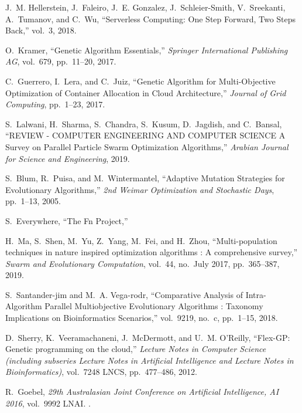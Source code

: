 \documentclass[runningheads]{llncs}
\begin{document}
   \begin{thebibliography}{10}

    J.~M. Hellerstein, J.~Faleiro, J.~E. Gonzalez, J.~Schleier-Smith, V.~Sreekanti,
      A.~Tumanov, and C.~Wu, ``{Serverless Computing: One Step Forward, Two Steps
      Back},'' vol.~3, 2018.
    
    O.~Kramer, ``{Genetic Algorithm Essentials},'' {\em Springer International
      Publishing AG}, vol.~679, pp.~11--20, 2017.
    
    C.~Guerrero, I.~Lera, and C.~Juiz, ``{Genetic Algorithm for Multi-Objective
      Optimization of Container Allocation in Cloud Architecture},'' {\em Journal
      of Grid Computing}, pp.~1--23, 2017.
    
    S.~Lalwani, H.~Sharma, S.~Chandra, S.~Kusum, D.~Jagdish, and C.~Bansal,
      ``{REVIEW - COMPUTER ENGINEERING AND COMPUTER SCIENCE A Survey on Parallel
      Particle Swarm Optimization Algorithms},'' {\em Arabian Journal for Science
      and Engineering}, 2019.
    
    S.~Blum, R.~Puisa, and M.~Wintermantel, ``{Adaptive Mutation Strategies for
      Evolutionary Algorithms},'' {\em 2nd Weimar Optimization and Stochastic
      Days}, pp.~1--13, 2005.
    
    S.~Everywhere, ``{The Fn Project},''
    
    H.~Ma, S.~Shen, M.~Yu, Z.~Yang, M.~Fei, and H.~Zhou, ``{Multi-population
      techniques in nature inspired optimization algorithms : A comprehensive
      survey},'' {\em Swarm and Evolutionary Computation}, vol.~44, no.~July 2017,
      pp.~365--387, 2019.
    
    S.~Santander-jim and M.~A. Vega-rodr, ``{Comparative Analysis of
      Intra-Algorithm Parallel Multiobjective Evolutionary Algorithms : Taxonomy
      Implications on Bioinformatics Scenarios},'' vol.~9219, no.~c, pp.~1--15,
      2018.
    
    D.~Sherry, K.~Veeramachaneni, J.~McDermott, and U.~M. O'Reilly, ``{Flex-GP:
      Genetic programming on the cloud},'' {\em Lecture Notes in Computer Science
      (including subseries Lecture Notes in Artificial Intelligence and Lecture
      Notes in Bioinformatics)}, vol.~7248 LNCS, pp.~477--486, 2012.
    
    R.~Goebel, {\em {29th Australasian Joint Conference on Artificial Intelligence,
      AI 2016}}, vol.~9992 LNAI.
    .
    

\end{thebibliography}
\end{document}
